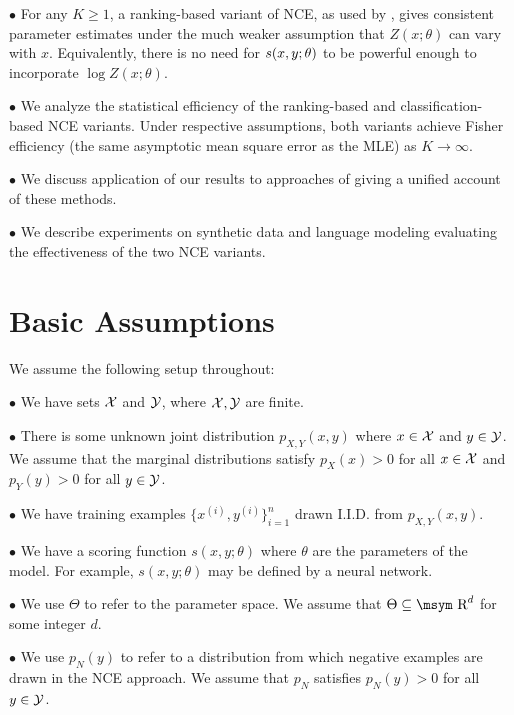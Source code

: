 \documentclass[11pt,a4paper]{article}
\newcommand{\reals}{\mbox{\msym R}}
\newcommand{\str}[3]{s(#1, #2; #3)}
\begin{document}
$\bullet$ For any $K \geq 1$, a ranking-based variant of NCE, as used by
  \cite{jozefowicz2016exploring}, gives consistent parameter estimates under the much
  weaker assumption that $Z(x; \theta)$ can vary with
  $x$. Equivalently, there is no need for $s(x, y; \theta)$ to be
  powerful enough to incorporate $\log Z(x; \theta)$.

$\bullet$ We analyze the statistical efficiency of the ranking-based and
  classification-based NCE variants. Under respective assumptions,
  both variants achieve Fisher efficiency (the same asymptotic
  mean square error as the MLE) as $K \rightarrow \infty$.

$\bullet$ We discuss application of our results to approaches of
\cite{mnih2012fast,Mikolov:2013,Levy:2014:NWE,jozefowicz2016exploring}
giving a unified account of these 
methods.

$\bullet$ We describe experiments on synthetic data and language modeling evaluating the
effectiveness of the two NCE variants.



\vspace{-1.5ex}
\section{Basic Assumptions}

We assume the following setup throughout:


$\bullet$ We have sets ${\cal X}$ and ${\cal Y}$, where ${\cal X}, {\cal Y}$ are
  finite. 

$\bullet$ There is some unknown joint distribution $p_{X, Y}(x, y)$ where
  $x \in {\cal X}$ and $y \in {\cal Y}$. We assume that the marginal distributions satisfy $p_X(x) >0$ for all $x \in {\cal X}$ and
  $p_Y(y)> 0$ for all $y\in {\cal Y}$. 

$\bullet$ We have training examples $\{x^{(i)}, y^{(i)}\}_{i=1}^n$
drawn I.I.D. from $p_{X, Y}(x, y)$.

 $\bullet$ We have a scoring function $\str{x}{y}{\theta}$ where $\theta$
   are the parameters of the model. For example, $\str{x}{y}{\theta}$ may
   be defined by a neural network. 


$\bullet$ We use $\Theta$ to refer to the parameter space.
We assume that $\Theta \subseteq \reals^d$ for some integer $d$.

$\bullet$ We use $p_N(y)$ to refer to a distribution from which
negative examples are drawn in the NCE approach. We assume that
$p_N$ satisfies $p_N(y) > 0$ for all $y\in {\cal Y}$.
\end{document}
